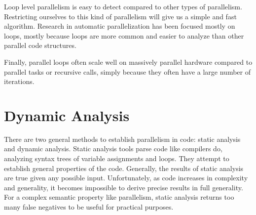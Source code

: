 \documentclass[12pt,twoside]{reedthesis}
\begin{document}
		Loop level parallelism is easy to detect compared to other types of parallelism. Restricting ourselves to this kind of parallelism will give us a simple and fast algorithm.
		Research in automatic parallelization has been focused mostly on loops, mostly because loops are more common and easier to analyze than other parallel code structures. 
		
		Finally, parallel loops often scale well on massively parallel hardware compared to parallel tasks or recursive calls, simply because they often have a large number of iterations.
%		
%		
%		
%		
%		
%		
		\section{Dynamic Analysis}
		
			There are two general methods to establish parallelism in code: static analysis and dynamic analysis. Static analysis tools parse code like compilers do, analyzing syntax trees of variable assignments and loops. They attempt to establish general properties of the code. Generally, the results of static analysis are true given any possible input. Unfortunately, as code increases in complexity and generality, it becomes impossible to derive precise results in full generality. 
			For a complex semantic property like parallelism, static analysis returns too many false negatives to be useful for practical purposes. 
			
\end{document}
